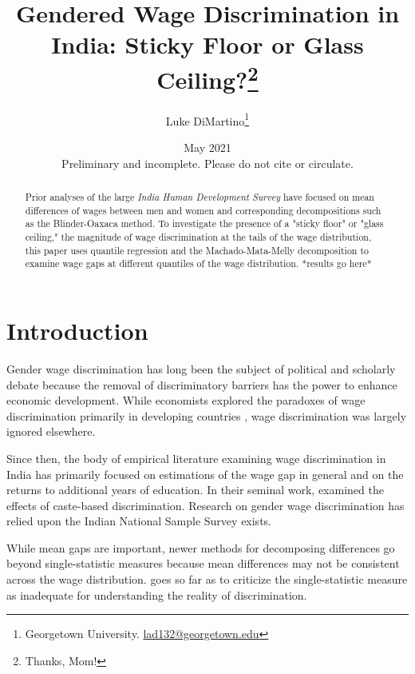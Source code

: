 \documentclass[12pt]{article}
\title{
Gendered Wage Discrimination in India: Sticky Floor or Glass Ceiling?\thanks{Thanks, Mom!}}
\author{Luke DiMartino\thanks{Georgetown University. \href{mailto:lad132@georgetown.edu}{lad132@georgetown.edu}}}
\date{May 2021 \\
\vspace*{.3cm}Preliminary and incomplete. Please do not cite or circulate.}
\begin{document}
\bgroup

\let\footnoterule\relax

\begin{singlespace}
\maketitle

\begin{abstract}
Prior analyses of the large \textit{India Human Development Survey} have focused on mean differences of wages between men and women and corresponding decompositions such as the Blinder-Oaxaca method. To investigate the presence of a "sticky floor" or "glass ceiling," the magnitude of wage discrimination at the tails of the wage distribution, this paper uses quantile regression and the Machado-Mata-Melly decomposition to examine wage gaps at different quantiles of the wage distribution. *results go here* 
\end{abstract}
\end{singlespace}
\thispagestyle{empty}

\clearpage
\egroup
\setcounter{page}{1}

\section{Introduction
\label{sec:introduction}}

Gender wage discrimination has long been the subject of political and scholarly debate because the removal of discriminatory barriers has the power to enhance economic development. While economists explored the paradoxes of wage discrimination primarily in developing countries \citep{BlauKahn}, wage discrimination was largely ignored elsewhere. 

Since then, the body of empirical literature examining wage discrimination in India has primarily focused on estimations of the wage gap in general and on the returns to additional years of education. In their seminal work, \citet{BanerjeeandKnight1985} examined the effects of caste-based discrimination. Research on gender wage discrimination has relied upon the Indian National Sample Survey \citet{BhaumikChakrabarty}  \citet{Agrawal2014} exists.

While mean gaps are important, newer methods for decomposing differences go beyond single-statistic measures because mean differences may not be consistent across the wage distribution. \citet{Jenkins1994} goes so far as to criticize the single-statistic measure as inadequate for understanding the reality of discrimination. 
\end{document}
